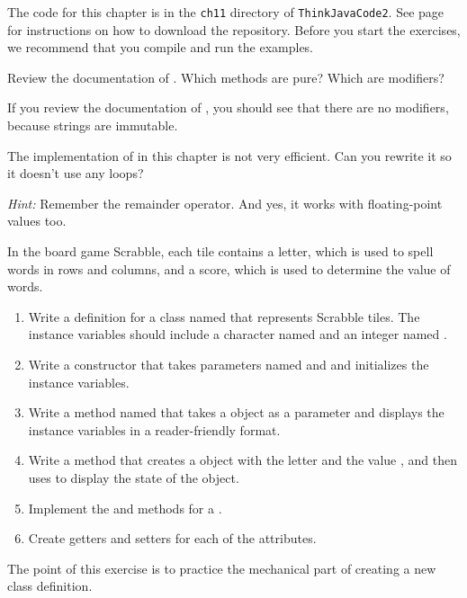 The code for this chapter is in the {\tt ch11} directory of {\tt ThinkJavaCode2}.
See page~\pageref{code} for instructions on how to download the repository.
Before you start the exercises, we recommend that you compile and run the examples.


\begin{exercise}  %

Review the documentation of .
Which methods are pure?
Which are modifiers?

If you review the documentation of , you should see that there are no modifiers, because strings are immutable.

\end{exercise}


\begin{exercise}  %

The implementation of  in this chapter is not very efficient.
Can you rewrite it so it doesn't use any loops?

{\it Hint:} Remember the remainder operator. And yes, it works with floating-point values too.

\end{exercise}


\begin{exercise}  %

In the board game Scrabble, each tile contains a letter, which is used to spell words in rows and columns, and a score, which is used to determine the value of words.

\begin{enumerate}

\item Write a definition for a class named  that represents Scrabble tiles.
The instance variables should include a character named  and an integer named .

\item Write a constructor that takes parameters named  and  and initializes the instance variables.

\item Write a method named  that takes a  object as a parameter and displays the instance variables in a reader-friendly format.

\item Write a  method that creates a  object with the letter  and the value , and then uses  to display the state of the object.

\item Implement the  and  methods for a .

\item Create getters and setters for each of the attributes.

\end{enumerate}

The point of this exercise is to practice the mechanical part of creating a new class definition.
\end{exercise}


